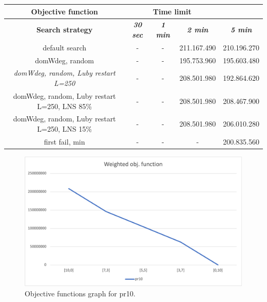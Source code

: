 {
\renewcommand{\arraystretch}{2}
\begin{longtable}[h]{| c | c | c | c | c |}
    \hline
    \textbf{Objective function} & \multicolumn{3}{c}{Time limit} & \\
    \hline
    \textbf{Search strategy} & \textbf{\textit{30 sec}} & \textbf{\textit{1 min}} & \textbf{\textit{2 min}} & \textbf{\textit{5 min}} \\
    \hline
    \endhead
    default search                                & - & - & 211.167.490 & 210.196.270 \\
    \hline
    domWdeg, random                               & - & - & 195.753.960 & 195.603.480 \\
    \hline
    \textit{domWdeg, random, Luby restart L=250}  & - & - & 208.501.980 & 192.864.620 \\
    \hline
    domWdeg, random, Luby restart L=250, LNS 85\% & - & - & 208.501.980 & 208.467.900 \\
    \hline
    domWdeg, random, Luby restart L=250, LNS 15\% & - & - & 208.501.980 & 206.010.280 \\
    \hline
    first fail, min                               & - & - &         - & 200.835.560 \\
    \hline
\end{longtable}
}
\begin{figure}[H]
    \centering
    \includegraphics[width=1.0\columnwidth]{../graphs/pr10-wobjf.png}
    \caption{Objective functions graph for pr10.}
\end{figure}

